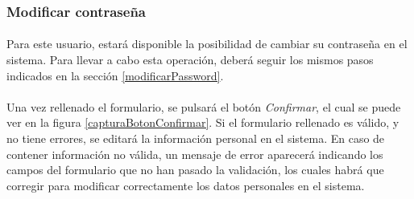   \subsubsection{Modificar contraseña}

  \paragraph{}Para este usuario, estará disponible la posibilidad de cambiar su
  contraseña en el sistema. Para llevar a cabo esta operación, deberá seguir los
  mismos pasos indicados en la sección \ref{modificarPassword}.

  \paragraph{}Una vez rellenado el formulario, se pulsará el botón
  \textit{Confirmar}, el cual se puede ver en la figura
  \ref{capturaBotonConfirmar}. Si el formulario rellenado es válido, y no tiene
  errores, se editará la información personal en el sistema. En caso de
  contener información no válida, un mensaje de error aparecerá indicando los
  campos del formulario que no han pasado la validación, los cuales habrá que
  corregir para modificar correctamente los datos personales en el sistema.
